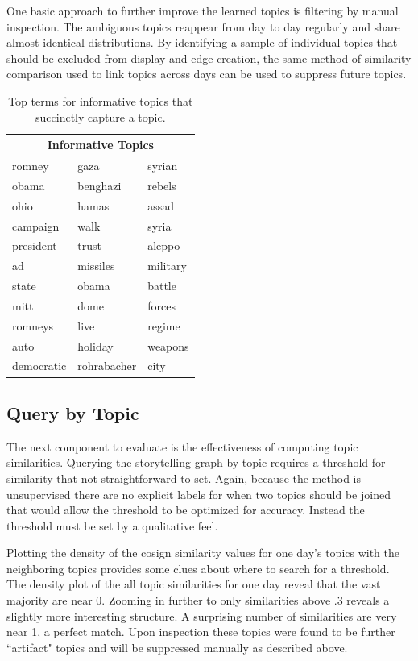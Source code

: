 \documentclass[10pt]{article}
\begin{document}
One basic approach to further improve the learned topics is filtering by manual inspection.  The ambiguous topics reappear from day to day regularly and share almost identical distributions.  By identifying a sample of individual topics that should be excluded from display and edge creation, the same method of similarity comparison used to link topics across days can be used to suppress future topics.


\begin{table}
\begin{center}
\begin{tabular}{|l|l|l|}
  \hline
  \multicolumn{3}{|c|}{Informative Topics} \\
  \hline
romney & gaza & syrian \\
obama & benghazi & rebels \\ 
ohio & hamas & assad \\
campaign & walk & syria \\ 
president & trust & aleppo \\
ad & missiles & military \\
state & obama &  battle \\
mitt & dome & forces \\
romneys & live & regime \\
auto & holiday & weapons \\
democratic & rohrabacher & city \\
  \hline
\end{tabular}
\caption*{Top terms for informative topics that succinctly capture a topic.}
\end{center}
\end{table}

\subsection {Query by Topic}
The next component to evaluate is the effectiveness of computing topic similarities.  Querying the storytelling graph by topic requires a threshold for similarity that not straightforward to set.  Again, because the method is unsupervised there are no explicit labels for when two topics should be joined that would allow the threshold to be optimized for accuracy.   Instead the threshold must be set by a qualitative feel.

Plotting the density of the cosign similarity values for one day's topics with the neighboring topics provides some clues about where to search for a threshold.  The density plot of the all topic similarities for one day reveal that the vast majority are near 0.  Zooming in further to only similarities above .3 reveals a slightly more interesting structure.  A surprising number of similarities are very near 1, a perfect match.  Upon inspection these topics were found to be further ``artifact" topics and will be suppressed manually as described above.
\end{document}
